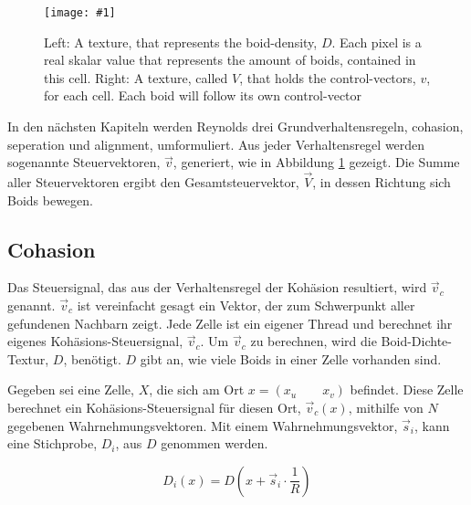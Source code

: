 \documentclass[a4paper, 10pt, journal]{wissarbIEEE}      %
\newcommand{\bild}[3]{
\begin{figure}[h]
\centering
  \texttt{[image: \#1]}
  \caption{#3}
  \label{#1}
\end{figure}}
\begin{document}

\bild{bilder/Schwarmdarstellung}{5cm}{Left: A texture, that represents the boid-density, $D$. Each pixel is a real skalar value that represents the amount of boids, contained in this cell. Right: A texture, called $V$, that holds the control-vectors, $v$, for each cell. Each boid will follow its own control-vector}

In den nächsten Kapiteln werden Reynolds drei Grundverhaltensregeln, cohasion, seperation und alignment, umformuliert. Aus jeder Verhaltensregel werden sogenannte Steuervektoren, $\vec{v}$, generiert, wie in Abbildung \ref{bilder/Schwarmdarstellung} gezeigt. Die Summe aller Steuervektoren ergibt den Gesamtsteuervektor, $\vec{V}$, in dessen Richtung sich Boids bewegen.



\subsection{Cohasion}

Das Steuersignal, das aus der Verhaltensregel der Kohäsion resultiert, wird $\vec{v}_c$ genannt. $\vec{v}_c$ ist vereinfacht gesagt ein Vektor, der zum Schwerpunkt aller gefundenen Nachbarn zeigt. 
Jede Zelle ist ein eigener Thread und berechnet ihr eigenes Kohäsions-Steuersignal, $\vec{v}_c$.
Um $\vec{v}_c$ zu berechnen, wird die Boid-Dichte-Textur, $D$, benötigt. $D$ gibt an, wie viele Boids in einer Zelle vorhanden sind.

Gegeben sei eine Zelle, $X$, die sich am Ort $x = (x_u \qquad x_v)$ befindet. Diese Zelle berechnet ein Kohäsions-Steuersignal für diesen Ort, $\vec{v}_c(x)$, mithilfe von $N$ gegebenen Wahrnehmungsvektoren. Mit einem Wahrnehmungsvektor, $\vec{s}_i$, kann eine Stichprobe, $D_i$, aus $D$ genommen werden.

\begin{equation}
D_i(x) = D(x + \vec{s}_i \cdot \frac{1}{R})
\label{Form_Di}
\end{equation}

\end{document}
